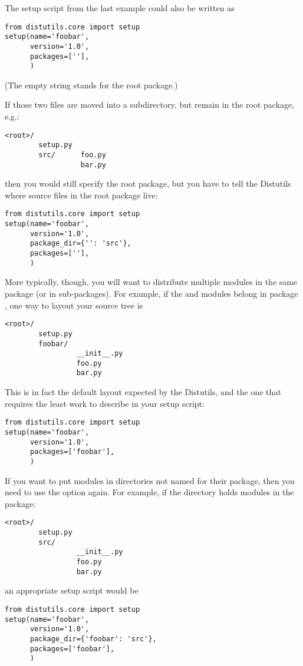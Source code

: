 \documentclass{manual}
\begin{document}
The setup script from the last example could also be written as
\begin{verbatim}
from distutils.core import setup
setup(name='foobar',
      version='1.0',
      packages=[''],
      )
\end{verbatim}
(The empty string stands for the root package.)

If those two files are moved into a subdirectory, but remain in the root
package, e.g.:
\begin{verbatim}
<root>/
        setup.py
        src/      foo.py
                  bar.py
\end{verbatim}
then you would still specify the root package, but you have to tell the
Distutils where source files in the root package live:
\begin{verbatim}
from distutils.core import setup
setup(name='foobar',
      version='1.0',
      package_dir={'': 'src'},
      packages=[''],
      )
\end{verbatim}

More typically, though, you will want to distribute multiple modules in
the same package (or in sub-packages).  For example, if the  
and  modules belong in package , one way to
layout your source tree is
\begin{verbatim}
<root>/
        setup.py
        foobar/
                 __init__.py
                 foo.py
                 bar.py
\end{verbatim}
This is in fact the default layout expected by the Distutils, and the
one that requires the least work to describe in your setup script:
\begin{verbatim}
from distutils.core import setup
setup(name='foobar',
      version='1.0',
      packages=['foobar'],
      )
\end{verbatim}

If you want to put modules in directories not named for their package,
then you need to use the  option again.  For
example, if the  directory holds modules in the
 package:
\begin{verbatim}
<root>/
        setup.py
        src/
                 __init__.py
                 foo.py
                 bar.py
\end{verbatim}
an appropriate setup script would be
\begin{verbatim}
from distutils.core import setup
setup(name='foobar',
      version='1.0',
      package_dir={'foobar': 'src'},
      packages=['foobar'],
      )
\end{verbatim}
\end{document}
